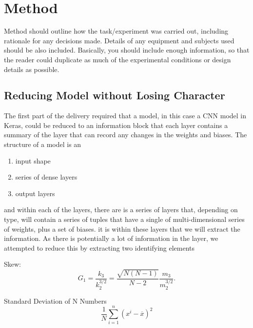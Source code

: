\section{Method}
Method should outline how the task/experiment was carried out, including rationale for any decisions made. Details of any equipment and subjects used should be also included. Basically, you should include enough information, so that the reader could duplicate as much of the experimental conditions or design details as possible.

\subsection{Reducing Model without Losing Character}
The first part of the delivery required that a model, in this case a CNN model in Keras, could be reduced to an information block that each layer contains a summary of the layer that can record any changes in the weights and biases. The structure of a model is an 
\begin{enumerate}
\item input shape
\item series of dense layers
\item output layers
\end{enumerate}

and within each of the layers, there are is a series of layers that, depending on type, will contain a series of tuples that have a single of multi-dimensional series of weights, plus a set of biases. it is within these layers that we will extract the information. As there is potentially a lot of information in the layer, we attempted to reduce this by extracting two identifying elements

Skew:
\[ G_1=\frac{k_3}{k_2^{3/2}}=\frac{\sqrt{N(N-1)}}{N-2}\frac{m_3}{m_2^{3/2}}. \]

Standard Deviation of N Numbers
\[ \frac1N\sum_{i=1}^n\left(x^i-\overline x\right)^2 \]

